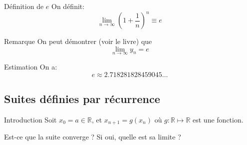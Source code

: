 \documentclass[a4paper]{article}
\begin{document}
\begin{parag}{Définition de $e$}
    On définit:
    \[\lim_{n \to \infty} \left(1 + \frac{1}{n}\right)^{n} \equiv e\]

    \begin{subparag}{Remarque}
        On peut démontrer (voir le livre) que
        \[\lim_{n \to \infty} y_n = e\]
    \end{subparag}

    \begin{subparag}{Estimation}
        On a:
        \[e \approx 2.718281828459045\ldots\]
    \end{subparag}
\end{parag}


\subsection{Suites définies par récurrence}
\begin{parag}{Introduction}
    Soit $x_0 = a \in \mathbb{R}$, et $x_{n + 1} = g\left(x_n\right)$ où $g: \mathbb{R} \mapsto \mathbb{R}$ est une fonction.

    Est-ce que la suite converge ? Si oui, quelle est sa limite ?
\end{parag}
\end{document}
